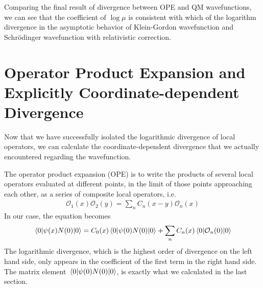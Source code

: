 \documentclass{article}
\begin{document}
Comparing the final result of divergence between OPE and QM wavefunctions, we can see that the coefficient of $\log{\mu}$ is consistent with which of the logarithm divergence in the asymptotic behavior of Klein-Gordon wavefunction and Schr\"odinger wavefunction with relativistic correction.

\section{Operator Product Expansion and Explicitly Coordinate-dependent Divergence}
Now that we have successfully isolated the logarithmic divergence of local operators, we can calculate the coordinate-dependent divergence that we actually encountered regarding the wavefunction.

The operator product expansion\cite{Collins1984} (OPE) is to write the products of several local operators evaluated at different points, in the limit of those points approaching each other, as a series of composite local operators, i.e.
\begin{align}
	\mathcal{O}_1(x)\mathcal{O}_2(y)=\sum_nC_n(x-y)\mathcal{O}_n(x)
\end{align}
In our case, the equation becomes
\begin{align}
	\mel{0}{\psi(x)N(0)}{0}=C_0(x)\mel{0}{\psi(0)N(0)}{0}+\sum_nC_n(x)\mel{0}{\mathcal{O}_n(0)}{0}\label{OPE}
\end{align}
The logarithmic divergence, which is the highest order of divergence on the left hand side, only appears in the coefficient of the first term in the right hand side. The matrix element $\mel{0}{\psi(0)N(0)}{0}$, is exactly what we calculated in the last section. 
\end{document}
